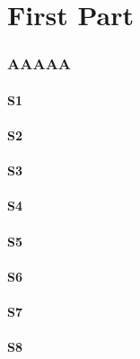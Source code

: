 \documentclass[12pt,a4paper]{article}
\begin{document}
\dosecttoc
\dosectlof[c]                   %
\dosectlot
\doparttoc                      %
\dopartlof                      %
\dopartlot                      %
\faketableofcontents            %
\fakelistoffigures              %
\fakelistoftables               %
\part{First Part} \parttoc \partlof[r] \partlot
\twocolumn\sloppy               %
\section{AAAAA}                 %
\secttoc[r]                     %
\mtcskip \sectlof %
\lipsum[1]
\subsection{S1} \lipsum[2]
\subsection{S2} \lipsum[3]
\subsection{S3} \lipsum[4]
\subsection*{S4}
\lipsum[5]
\subsection{S5} \lipsum[6]
\subsection{S6} \lipsum[7]
\subsection{S7} \lipsum[8]
\subsection{S8} \lipsum[9]
\end{document}
